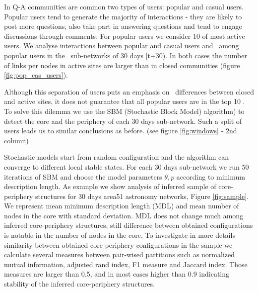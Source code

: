 In Q-A communities are common two types of users: popular and casual users. Popular users tend to generate the majority of interactions - they are likely to post more questions, also take part in answering questions and tend to engage discussions through comments. For popular users we consider $10 $  of most active users. We analyse interactions between popular and casual users and  among popular users in the  sub-networks of 30 days [t+30). In both cases the number of links per nodes in active sites are larger than in closed communities (figure \ref{fig:pop_cas_users}).

Although this separation of users puts an emphasis on  differences between closed and active sites, it does not guarantee that all popular users are in the top 10 . To solve this dilemma we use the SBM (Stochastic Block Model) algorithm) to detect the core and the periphery of each 30 days sub-network. Such a split of users leads us to similar conclusions as before. (see figure \ref{fig:windows} - 2nd column)

Stochastic models start from random configuration and the algorithm  can converge to different local stable states. For each 30 days sub-network we run 50 iterations of SBM and choose the model parameters $\theta, p$ according to minimum description length. As example we show analysis of inferred sample of  core-periphery structures for 30 days area51 astronomy networks, Figure \ref{fig:sample}. We represent mean minimum description length (MDL) and mean number of nodes in the core with standard deviation. MDL does not change much among inferred core-periphery structures, still difference between obtained configurations is notable in the number of nodes in the core.  To investigate in more details similarity between obtained core-periphery configurations in the sample we calculate several measures between pair-wised partitions such as normalized mutual information, adjusted rand index, F1 measure and Jaccard index. Those measures are larger than 0.5, and in most cases higher than 0.9 indicating stability of the inferred core-periphery structures.




